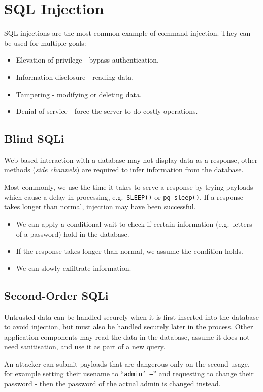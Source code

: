 \documentclass[11pt]{article}
\begin{document}
\section{SQL Injection}
SQL injections are the most common example of command injection.
They can be used for multiple goals:
\begin{itemize}
  \item Elevation of privilege - bypass authentication.
  \item Information disclosure - reading data.
  \item Tampering - modifying or deleting data.
  \item Denial of service - force the server to do costly operations.
\end{itemize}

\subsection{Blind SQLi}
Web-based interaction with a database may not display data as a response, other methods (\textit{side channels}) are required to infer information from the database.

Most commonly, we use the time it takes to serve a response by trying payloads which cause a delay in processing, e.g.\ \texttt{SLEEP()} or \texttt{pg\_sleep()}.
If a response takes longer than normal, injection may have been successful.
\begin{itemize}
  \item We can apply a conditional wait to check if certain information (e.g.\ letters of a password) hold in the database.
  \item If the response takes longer than normal, we assume the condition holds.
  \item We can slowly exfiltrate information.
\end{itemize}

\subsection{Second-Order SQLi}
Untrusted data can be handled securely when it is first inserted into the database to avoid injection, but must also be handled securely later in the process.
Other application components may read the data in the database, assume it does not need sanitisation, and use it as part of a new query.

An attacker can submit payloads that are dangerous only on the second usage, for example setting their usename to ``\texttt{admin' --}'' and requesting to change their password - then the password of the actual admin is changed instead.
\end{document}
